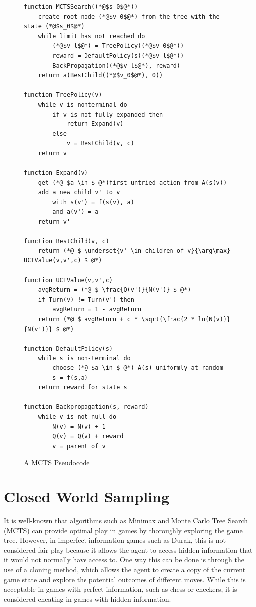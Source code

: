 \begin{figure}[h]
\captionsetup{justification=centering}
\begin{lstlisting}
function MCTSSearch((*@$s_0$@*))
    create root node (*@$v_0$@*) from the tree with the state (*@$s_0$@*)
    while limit has not reached do
        (*@$v_l$@*) = TreePolicy((*@$v_0$@*))
        reward = DefaultPolicy(s((*@$v_l$@*))
        BackPropagation((*@$v_l$@*), reward)
    return a(BestChild((*@$v_0$@*), 0))
	
function TreePolicy(v)
    while v is nonterminal do 
        if v is not fully expanded then
            return Expand(v)
        else
            v = BestChild(v, c)
    return v

function Expand(v)
    get (*@ $a \in $ @*)first untried action from A(s(v))
    add a new child v' to v
        with s(v') = f(s(v), a) 
        and a(v') = a
    return v'
	
function BestChild(v, c)
    return (*@ $ \underset{v' \in children of v}{\arg\max} UCTValue(v,v',c) $ @*)
	
function UCTValue(v,v',c)
    avgReturn = (*@ $ \frac{Q(v')}{N(v')} $ @*)
    if Turn(v) != Turn(v') then 
        avgReturn = 1 - avgReturn
    return (*@ $ avgReturn + c * \sqrt{\frac{2 * ln{N(v)}}{N(v')}} $ @*)
	
function DefaultPolicy(s)
    while s is non-terminal do
        choose (*@ $a \in $ @*) A(s) uniformly at random
        s = f(s,a)
    return reward for state s

function Backpropagation(s, reward)
    while v is not null do
        N(v) = N(v) + 1
        Q(v) = Q(v) + reward
        v = parent of v
\end{lstlisting}
\caption{A MCTS Pseudocode}
\label{fig:mctsREST}
\end{figure}

\section{Closed World Sampling}
\label{closedWorld}
It is well-known that algorithms such as Minimax and Monte Carlo Tree Search (MCTS) can provide optimal play in games by thoroughly exploring the game tree. However, in imperfect information games such as Durak, this is not considered fair play because it allows the agent to access hidden information that it would not normally have access to. One way this can be done is through the use of a cloning method, which allows the agent to create a copy of the current game state and explore the potential outcomes of different moves. While this is acceptable in games with perfect information, such as chess or checkers, it is considered cheating in games with hidden information.

